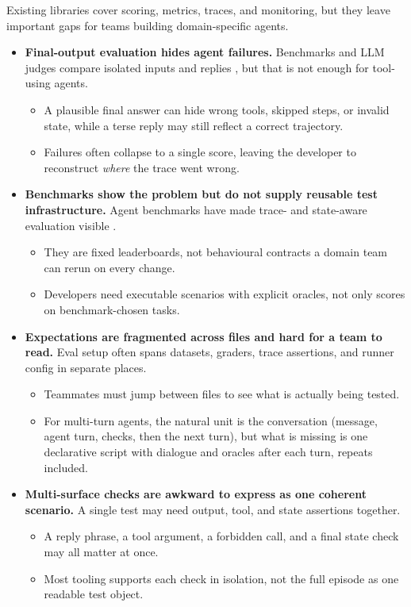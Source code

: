 Existing libraries cover scoring, metrics, traces, and monitoring, but they leave important gaps for teams building domain-specific agents.

\begin{itemize}
    \item \textbf{Final-output evaluation hides agent failures.}
    Benchmarks and LLM judges compare isolated inputs and replies \citep{liang2022helm,liu2023geval}, but that is not enough for tool-using agents.
    \begin{itemize}
        \item A plausible final answer can hide wrong tools, skipped steps, or invalid state, while a terse reply may still reflect a correct trajectory.
        \item Failures often collapse to a single score, leaving the developer to reconstruct \emph{where} the trace went wrong.
    \end{itemize}

    \item \textbf{Benchmarks show the problem but do not supply reusable test infrastructure.}
    Agent benchmarks have made trace- and state-aware evaluation visible \citep{yao2024taubench,trivedi2024appworld}.
    \begin{itemize}
        \item They are fixed leaderboards, not behavioural contracts a domain team can rerun on every change.
        \item Developers need executable scenarios with explicit oracles, not only scores on benchmark-chosen tasks.
    \end{itemize}

    \item \textbf{Expectations are fragmented across files and hard for a team to read.}
    Eval setup often spans datasets, graders, trace assertions, and runner config in separate places.
    \begin{itemize}
        \item Teammates must jump between files to see what is actually being tested.
        \item For multi-turn agents, the natural unit is the conversation (message, agent turn, checks, then the next turn), but what is missing is one declarative script with dialogue and oracles after each turn, repeats included.
    \end{itemize}

    \item \textbf{Multi-surface checks are awkward to express as one coherent scenario.}
    A single test may need output, tool, and state assertions together.
    \begin{itemize}
        \item A reply phrase, a tool argument, a forbidden call, and a final state check may all matter at once.
        \item Most tooling supports each check in isolation, not the full episode as one readable test object.
    \end{itemize}


\end{itemize}
